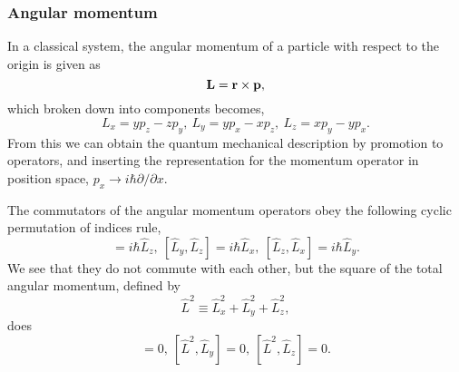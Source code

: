     \subsubsection{Angular momentum}
    In a classical system, the angular momentum of a particle with 
    respect to the origin is given as
    \begin{equation}
        \vb{L} = \vb{r} \times \vb{p},
    \end{equation}
    which broken down into components becomes,
    \begin{equation}
        L_x = y p_z - z p_y,\ 
        L_y = y p_x - x p_z,\ 
        L_z = x p_y - y p_x.
    \end{equation}
    From this we can obtain the quantum mechanical description by promotion to operators,
    and inserting the representation for the momentum operator in position space,
    $p_x \to i\hbar \partial / \partial x$.

    The commutators of the angular momentum operators obey the following cyclic
    permutation of indices rule,
    \begin{equation}
        [\hat{L}_x, \hat{L}_y] = i\hbar \hat{L}_z, \  
        [\hat{L}_y, \hat{L}_z] = i\hbar \hat{L}_x, \ 
        [\hat{L}_z, \hat{L}_x] = i\hbar \hat{L}_y.
    \end{equation}
    We see that they do not commute with each other, but the square of the total 
    angular momentum, defined by 
    \begin{equation}
        \hat{L}^2 \equiv \hat{L}_x^2 + \hat{L}_y^2 + \hat{L}_z^2,
    \end{equation}
    does
    \begin{equation}
        [\hat{L}^2, \hat{L}_x] = 0, \ 
        [\hat{L}^2, \hat{L}_y] = 0, \ 
        [\hat{L}^2, \hat{L}_z] = 0.
    \end{equation}

